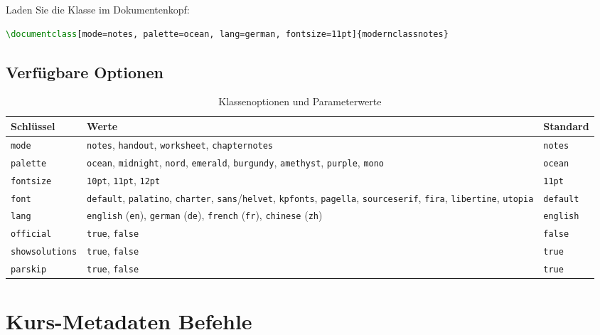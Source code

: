 \documentclass[mode=notes, palette=ocean, lang=german, fontsize=11pt]{modernclassnotes}
\begin{document}
Laden Sie die Klasse im Dokumentenkopf:
\begin{codebox}
\begin{lstlisting}[language=TeX]
\documentclass[mode=notes, palette=ocean, lang=german, fontsize=11pt]{modernclassnotes}
\end{lstlisting}
\end{codebox}

\subsection{Verfügbare Optionen}
\begin{table}[h]
\centering
\begin{tabular}{l|p{9.5cm}|l}
\toprule
\textbf{Schlüssel} & \textbf{Werte} & \textbf{Standard} \\
\midrule
\texttt{mode} & \texttt{notes}, \texttt{handout}, \texttt{worksheet}, \texttt{chapternotes} & \texttt{notes} \\ \hline
\texttt{palette} & \texttt{ocean}, \texttt{midnight}, \texttt{nord}, \texttt{emerald}, \texttt{burgundy}, \texttt{amethyst}, \texttt{purple}, \texttt{mono} & \texttt{ocean} \\ \hline
\texttt{fontsize} & \texttt{10pt}, \texttt{11pt}, \texttt{12pt} & \texttt{11pt} \\ \hline
\texttt{font} & \texttt{default}, \texttt{palatino}, \texttt{charter}, \texttt{sans}/\texttt{helvet}, \texttt{kpfonts}, \texttt{pagella}, \texttt{sourceserif}, \texttt{fira}, \texttt{libertine}, \texttt{utopia} & \texttt{default} \\ \hline
\texttt{lang} & \texttt{english} (\texttt{en}), \texttt{german} (\texttt{de}), \texttt{french} (\texttt{fr}), \texttt{chinese} (\texttt{zh}) & \texttt{english} \\ \hline
\texttt{official} & \texttt{true}, \texttt{false} & \texttt{false} \\ \hline
\texttt{showsolutions} & \texttt{true}, \texttt{false} & \texttt{true} \\ \hline
\texttt{parskip} & \texttt{true}, \texttt{false} & \texttt{true} \\
\bottomrule
\end{tabular}
\caption{Klassenoptionen und Parameterwerte}
\end{table}

\section{Kurs-Metadaten Befehle}
\end{document}
